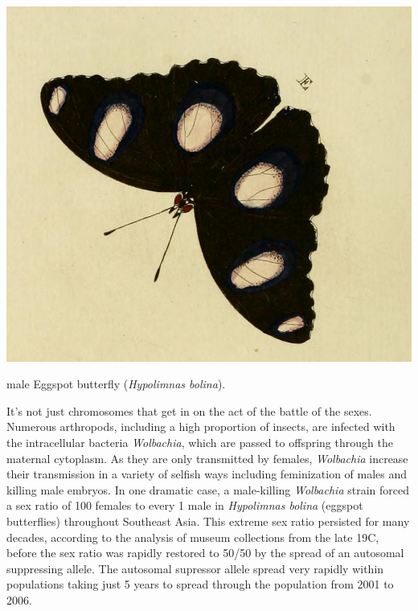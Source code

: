 {  \begin{marginfigure}
\begin{center}
\includegraphics[width= \textwidth]{illustration_images/single_locus_selection/Hypolimnas_bolina/Hypolimnas_bolina.png}
\end{center}
\caption{male Eggspot butterfly ({\it Hypolimnas bolina}).  } \label{fig:Hypolimnas_bolina}
\end{marginfigure}  %

It's not just chromosomes that get in on the act of the battle
of the sexes.  Numerous arthropods, including a high proportion of
insects, are infected with the intracellular bacteria {\it
  Wolbachia}, which are passed to offspring through the
maternal cytoplasm. As they are only transmitted by females, {\it
  Wolbachia} increase their transmission in a variety of selfish ways
including feminization of males and killing male embryos. In one
dramatic case, a male-killing {\it Wolbachia} strain forced a sex ratio of 100 females
to every 1 male in {\it Hypolimnas bolina} (eggspot butterflies)
throughout Southeast Asia. This extreme sex ratio persisted for many decades,
according to the analysis of museum collections from the late 19C,
before the sex ratio was rapidly restored to 50/50 by the spread of an
autosomal suppressing allele. The autosomal supressor allele 
spread very rapidly within populations taking just 5 years to spread
through the population from 2001 to 2006. 

}
